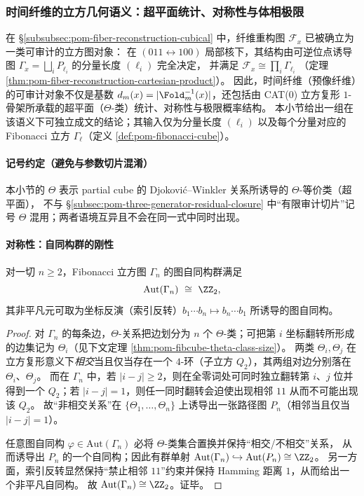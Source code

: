 \subsubsection{时间纤维的立方几何语义：超平面统计、对称性与体相极限}\label{subsubsec:pom-fiber-cubical-hyperplane-symmetry-limit}
在 \S\ref{subsubsec:pom-fiber-reconstruction-cubical} 中，纤维重构图 \(\mathcal F_x\) 已被确立为一类可审计的立方图对象：
在 \((011\leftrightarrow 100)\) 局部核下，其结构由可逆位点诱导图 \(\Gamma_x=\bigsqcup_i P_{\ell_i}\) 的分量长度 \((\ell_i)\) 完全决定，
并满足
\(
\mathcal F_x\cong\prod_i \Gamma_{\ell_i}
\)
（定理 \ref{thm:pom-fiber-reconstruction-cartesian-product}）。
因此，时间纤维（预像纤维）的可审计对象不仅是基数 \(d_m(x)=|\Fold_m^{-1}(x)|\)，还包括由 CAT(0) 立方复形 \(1\)-骨架所承载的超平面（\(\Theta\)-类）统计、对称性与极限概率结构。
本小节给出一组在该语义下可独立成文的结论；其输入仅为分量长度 \((\ell_i)\) 以及每个分量对应的 Fibonacci 立方 \(\Gamma_{\ell}\)（定义 \ref{def:pom-fibonacci-cube}）。

\paragraph{记号约定（避免与参数切片混淆）}
本小节的 \(\Theta\) 表示 partial cube 的 Djokovi\'c--Winkler 关系所诱导的 \(\Theta\)-等价类（超平面），
不与 \S\ref{subsec:pom-three-generator-residual-closure} 中“有限审计切片”记号 \(\Theta\) 混用；两者语境互异且不会在同一式中同时出现。

\paragraph{对称性：自同构群的刚性}

\begin{theorem}\label{thm:pom-fibcube-aut-z2}
对一切 \(n\ge 2\)，Fibonacci 立方图 \(\Gamma_n\) 的图自同构群满足
\[
\mathrm{Aut}(\Gamma_n)\ \cong\ \ZZ_2,
\]
其非平凡元可取为坐标反演（索引反转）\(b_1\cdots b_n\mapsto b_n\cdots b_1\) 所诱导的图自同构。
\end{theorem}
\begin{proof}
对 \(\Gamma_n\) 的每条边，\(\Theta\)-关系把边划分为 \(n\) 个 \(\Theta\)-类；可把第 \(i\) 坐标翻转所形成的边集记为 \(\Theta_i\)（见下文定理 \ref{thm:pom-fibcube-theta-class-size}）。
两类 \(\Theta_i,\Theta_j\) 在立方复形意义下\emph{相交}当且仅当存在一个 \(4\)-环（子立方 \(Q_2\)），其两组对边分别落在 \(\Theta_i\)、\(\Theta_j\)。
而在 \(\Gamma_n\) 中，若 \(|i-j|\ge 2\)，则在全零词处可同时独立翻转第 \(i\)、\(j\) 位并得到一个 \(Q_2\)；若 \(|i-j|=1\)，则任一同时翻转会迫使出现相邻 \(11\) 从而不可能出现该 \(Q_2\)。
故“非相交关系”在 \(\{\Theta_1,\dots,\Theta_n\}\) 上诱导出一张路径图 \(P_n\)（相邻当且仅当 \(|i-j|=1\)）。
\par
任意图自同构 \(\varphi\in\mathrm{Aut}(\Gamma_n)\) 必将 \(\Theta\)-类集合置换并保持“相交/不相交”关系，
从而诱导出 \(P_n\) 的一个自同构；因此有群单射
\(
\mathrm{Aut}(\Gamma_n)\hookrightarrow \mathrm{Aut}(P_n)\cong \ZZ_2
\)。
另一方面，索引反转显然保持“禁止相邻 \(11\)”约束并保持 Hamming 距离 \(1\)，从而给出一个非平凡自同构。
故 \(\mathrm{Aut}(\Gamma_n)\cong\ZZ_2\)。证毕。
\end{proof}

